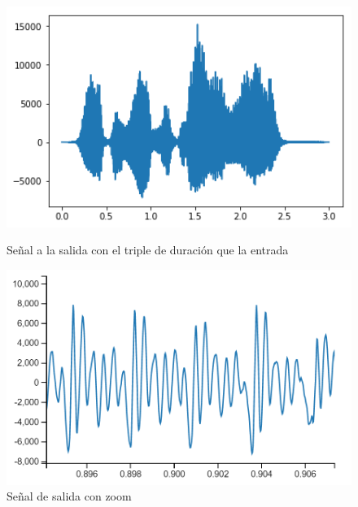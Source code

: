 \documentclass[assd_tp2_main.tex]{subfiles}
\begin{document}
\begin{figure}[H]
\centering
  \begin{minipage}{0.4\textwidth}
    \centering
    \includegraphics[width=1\textwidth]{graficos/EJ6/outx3.png}
    \caption{Señal a la salida con el triple de duración que la entrada}
    \label{fig:uno}
  \end{minipage}%
  \hspace{5mm}
  \begin{minipage}{0.4\textwidth}
    \centering
    \includegraphics[width=1\textwidth]{graficos/EJ6/outx3zoom.png}
    \caption{Señal de salida con zoom}
    \label{fig:dos}
  \end{minipage}
\end{figure}
\end{document}
